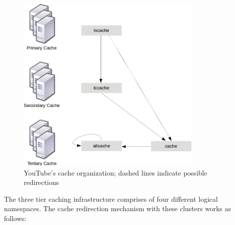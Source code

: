 \begin{figure}[htbp]
  \begin{center}
    \includegraphics[width=0.8\textwidth]{pictures/cache_server.png}
    \caption[YouTube's cache organization]{YouTube's cache organization; dashed lines indicate possible redirections}
    \label{fig:cache_server}
  \end{center}
\end{figure}

The three tier caching infrastructure comprises of four different logical namespaces. The cache redirection mechanism with these clusters works as follows:

